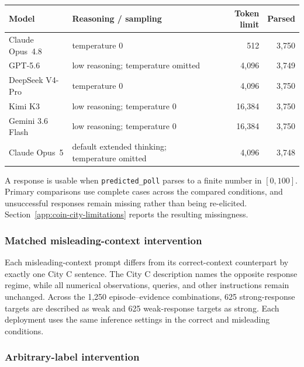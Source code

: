 \begin{center}
\begin{minipage}{\linewidth}
\centering
{}
\label{tab:coin-city-execution}
\small
\begin{tabular}{l l r r}
\toprule
Model & Reasoning / sampling & Token limit & Parsed \\
\midrule
Claude Opus~4.8 & temperature 0 & 512 & 3,750 \\
GPT-5.6 & low reasoning; temperature omitted & 4,096 & 3,749 \\
DeepSeek V4-Pro & temperature 0 & 4,096 & 3,750 \\
Kimi K3 & low reasoning; temperature 0 & 16,384 & 3,750 \\
Gemini 3.6 Flash & low reasoning; temperature 0 & 16,384 & 3,750 \\
Claude Opus~5 & default extended thinking; temperature omitted & 4,096 & 3,748 \\
\bottomrule
\end{tabular}
\end{minipage}
\end{center}

A response is usable when \texttt{predicted\_poll} parses to a finite number in \([0,100]\).
Primary comparisons use complete cases across the compared conditions, and unsuccessful responses remain missing rather than being re-elicited.
Section~\ref{app:coin-city-limitations} reports the resulting missingness.

\subsubsection{Matched misleading-context intervention}

Each misleading-context prompt differs from its correct-context counterpart by exactly one City C sentence.
The City C description names the opposite response regime, while all numerical observations, queries, and other instructions remain unchanged.
Across the 1,250 episode--evidence combinations, 625 strong-response targets are described as weak and 625 weak-response targets as strong.
Each deployment uses the same inference settings in the correct and misleading conditions.

\subsubsection{Arbitrary-label intervention}

